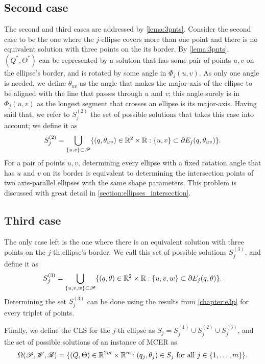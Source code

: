 \subsection{Second case}

The second and third cases are addressed by \autoref{lema:3pnts}. 
Consider the second case to be the one where the $j$-ellipse covers more than one point and there is no equivalent solution with three points on the its border. 
By \autoref{lema:3pnts}, $(Q^*, \Theta^*)$ can be represented by a solution that has some pair of points $u, v$ on the ellipse's border, and is rotated by some angle in $\Phi_j(u,v)$. 
As only one angle is needed, we define $\theta_{uv}$ as the angle that makes the major-axis of the ellipse to be aligned with the line that passes through $u$ and $v$; this angle surely is in $\Phi_j(u,v)$ as the longest segment that crosses an ellipse is its major-axis.
Having said that, we refer to $S_j^{(2)}$ the set of possible solutions that takes this case into account; we define it as
\begin{equation}
S_j^{(2)} = \bigcup_{\{u, v\} \subset \mathscr{P}} \{(q, \theta_{uv})\in \mathbb{R}^2\times\mathbb{R}: \{u,v\} \subset \partial E_j(q, \theta_{uv})\}.\\
\end{equation}
For a pair of points $u, v$, determining every ellipse with a fixed rotation angle that has $u$ and $v$ on its border is equivalent to determining the intersection points of two axis-parallel ellipses with the same shape parameters. This problem is discussed with great detail in \autoref{section:ellipses_intersection}.

\subsection{Third case}

The only case left is the one where there is an equivalent solution with three points on the $j$-th ellipse's border. We call this set of possible solutions $S_j^{(3)}$, and define it as
\begin{equation}
	S_j^{(3)} = \bigcup_{\{u, v, w\} \subset \mathscr{P}} \{(q, \theta)\in \mathbb{R}^2\times\mathbb{R}: \{u, v, w\} \subset \partial E_j(q, \theta)\}.
\end{equation}
Determining the set $S_j^{(3)}$ can be done using the results from \autoref{chapter:e3p} for every triplet of points.

Finally, we define the CLS for the $j$-th ellipse as $S_j = S_j^{(1)} \cup S_j^{(2)} \cup S_j^{(3)}$, and the set of possible solutions of an instance of MCER as
\begin{equation}\label{eq:omega}
\Omega(\mathscr{P}, \mathscr{W}, \mathscr{R}) = \{(Q, \Theta)\in \mathbb{R}^{2m}\times\mathbb{R}^m \colon (q_j, \theta_j) \in S_j \textnormal{ for all } j\in\{1, \dots, m\}\}.
\end{equation}

